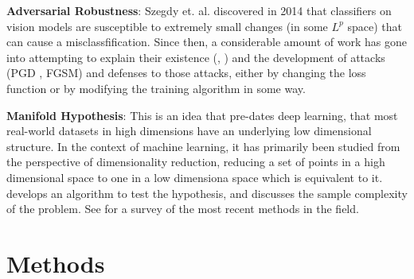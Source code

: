 \documentclass{article}
\begin{document}
            \textbf{Adversarial Robustness}: Szegdy et. al. discovered \cite{szegedy2014intriguingpropertiesneuralnetworks} in 2014 that classifiers on vision models are susceptible to extremely small changes (in some $L^p$ space) that can cause a misclassfification. Since then, a considerable amount of work has gone into attempting to explain their existence (\cite{shafahi2020adversarialexamplesinevitable}, \cite{shamir2022dimpledmanifoldmodeladversarial}) and the development of attacks (PGD \cite{madry2019deeplearningmodelsresistant}, FGSM\cite{goodfellow2015explainingharnessingadversarialexamples}) and defenses to those attacks, either by changing the loss function or by modifying the training algorithm in some way. 
            
            \textbf{Manifold Hypothesis}: This is an idea that pre-dates deep learning, that most real-world datasets in high dimensions have an underlying low dimensional structure. In the context of machine learning, it has primarily been studied from the perspective of dimensionality reduction, reducing a set of points in a high dimensional space to one in a low dimensiona space which is equivalent to it. \cite{fefferman2013testingmanifoldhypothesis} develops an algorithm to test the hypothesis, and \cite{NIPS2010_8a1e808b} discusses the sample complexity of the problem. See \cite{meil2023manifoldlearningwhathow} for a survey of the most recent methods in the field. 


    \section{Methods}

        
\end{document}
